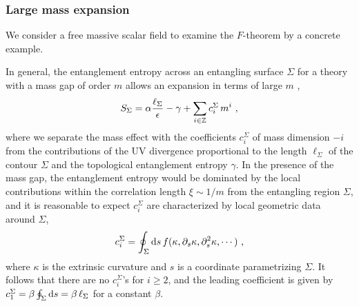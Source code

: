 \subsubsection{Large mass expansion}
 
We consider a free massive scalar field to examine the $F$-theorem by a concrete example.

In general, the entanglement entropy across an entangling surface $\Sigma$ for a theory with a mass gap of order $m$ allows an expansion in terms of large $m$ \cite{Grover:2011fa,Huerta:2011qi},
\begin{align}\label{EE_LargeMass}
S_\Sigma = \alpha \frac{\ell_\Sigma}{\epsilon} - \gamma + \sum_{i\in \mathbb{Z}} c_i^\Sigma\,m^i \ ,
\end{align}
where we separate the mass effect with the coefficients $c_{i}^\Sigma$ of mass dimension $-i$ from the contributions of the UV divergence proportional to the length $\ell_\Sigma$ of the contour $\Sigma$ and the topological entanglement entropy $\gamma$.
In the presence of the mass gap, the entanglement entropy would be dominated by the local contributions within the correlation length $\xi \sim 1/m$ from the entangling region $\Sigma$, and it is reasonable to expect $c_{i}^\Sigma$ are characterized by local geometric data around $\Sigma$,
\begin{align}
c_{i}^\Sigma = \oint_\Sigma \mathrm{d} s \,f(\kappa, \partial_s \kappa, \partial_s^2 \kappa,\cdots) \ ,
\end{align}
where $\kappa$ is the extrinsic curvature and $s$ is a coordinate parametrizing $\Sigma$.
It follows that there are no $c_{i}^\Sigma$'s for $i \ge 2$, and the leading coefficient is given by $c_{1}^\Sigma = \beta \oint_\Sigma \mathrm{d} s  = \beta\,\ell_\Sigma$ for a constant $\beta$.

